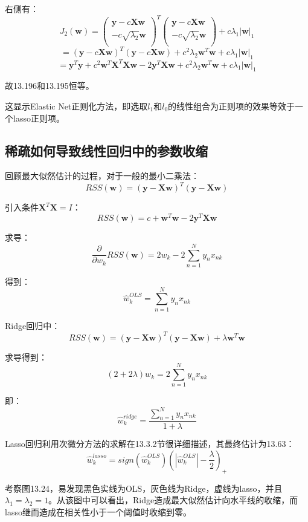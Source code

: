 \documentclass[UTF8]{ctexart}
\begin{document}
右侧有：
$$J_{2}(\textbf{w})=\begin{pmatrix}  
\textbf{y}-c\textbf{X}\textbf{w} \\
-c \sqrt{\lambda_{2}}\textbf{w} \\
\end{pmatrix}^{T}\begin{pmatrix}  
\textbf{y}-c\textbf{X}\textbf{w} \\
-c \sqrt{\lambda_{2}}\textbf{w} \\
\end{pmatrix}+c \lambda_{1}|\textbf{w}|_{1}$$
$$=(\textbf{y}-c\textbf{X}\textbf{w})^{T}(\textbf{y}-c\textbf{X}\textbf{w})+c^{2}\lambda_{2}\textbf{w}^{T}\textbf{w} +c \lambda_{1}|\textbf{w}|_{1}$$
$$=\textbf{y}^{T}\textbf{y}+ c^{2}\textbf{w}^{T}\textbf{X}^{T}\textbf{X}\textbf{w} - 2\textbf{y}^{T}\textbf{X}\textbf{w}+c^{2}\lambda_{2}\textbf{w}^{T}\textbf{w}+c\lambda_{1}|\textbf{w}|_{1}$$

故13.196和13.195恒等。

这显示Elastic Net正则化方法，即选取$l_{1}$和$l_{0}$的线性组合为正则项的效果等效于一个lasso正则项。

\subsection{稀疏如何导致线性回归中的参数收缩}
回顾最大似然估计的过程，对于一般的最小二乘法：
$$RSS(\textbf{w}) = (\textbf{y}-\textbf{X}\textbf{w})^{T}(\textbf{y}-\textbf{X}\textbf{w})$$

引入条件$\textbf{X}^{T}\textbf{X}=I$：
$$RSS(\textbf{w})=c+\textbf{w}^{T}\textbf{w}-2\textbf{y}^{T}\textbf{X}\textbf{w}$$

求导：
$$\frac{\partial}{\partial w_{k}}RSS(\textbf{w})=2w_{k}-2\sum_{n=1}^{N}y_{n}x_{nk}$$

得到：
$$\hat{w}_{k}^{OLS}=\sum_{n=1}^{N}y_{n}x_{nk}$$

Ridge回归中：
$$RSS(\textbf{w})=(\textbf{y}-\textbf{X}\textbf{w})^{T}(\textbf{y}-\textbf{X}\textbf{w}) + \lambda \textbf{w}^{T}\textbf{w}$$

求导得到：
$$(2+2\lambda)w_{k} = 2\sum_{n=1}^{N}y_{n}x_{nk}$$

即：
$$\hat{w}_{k}^{ridge}=\frac{\sum_{n=1}^{N}y_{n}x_{nk}}{1+\lambda}$$

Lasso回归利用次微分方法的求解在13.3.2节很详细描述，其最终估计为13.63：
$$\hat{w}_{k}^{lasso}=sign(\hat{w}_{k}^{OLS})(|\hat{w}_{k}^{OLS}|-\frac{\lambda}{2})_{+}$$

考察图13.24，易发现黑色实线为OLS，灰色线为Ridge，虚线为lasso，并且$\lambda_{1}=\lambda_{2}=1$。从该图中可以看出，Ridge造成最大似然估计向水平线的收缩，而lasso继而造成在相关性小于一个阈值时收缩到零。
\end{document}
